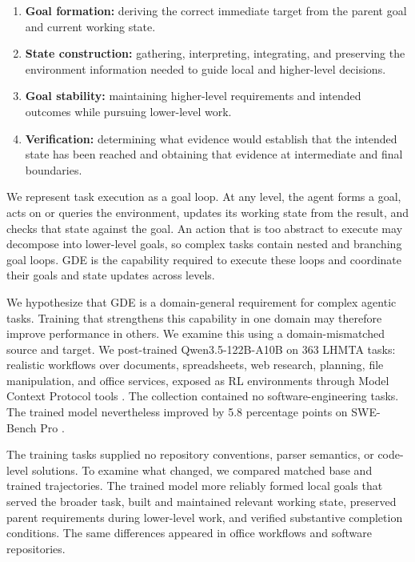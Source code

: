 \documentclass{article}
\begin{document}
\begin{enumerate}
  \item \textbf{Goal formation:} deriving the correct immediate target from the parent goal and current working state.
  \item \textbf{State construction:} gathering, interpreting, integrating, and preserving the environment information needed to guide local and higher-level decisions.
  \item \textbf{Goal stability:} maintaining higher-level requirements and intended outcomes while pursuing lower-level work.
  \item \textbf{Verification:} determining what evidence would establish that the intended state has been reached and obtaining that evidence at intermediate and final boundaries.
\end{enumerate}

We represent task execution as a goal loop. At any level, the agent forms a goal, acts on or queries the environment, updates its working state from the result, and checks that state against the goal. An action that is too abstract to execute may decompose into lower-level goals, so complex tasks contain nested and branching goal loops. GDE is the capability required to execute these loops and coordinate their goals and state updates across levels.

We hypothesize that GDE is a domain-general requirement for complex agentic tasks. Training that strengthens this capability in one domain may therefore improve performance in others. We examine this using a domain-mismatched source and target. We post-trained Qwen3.5-122B-A10B on 363 LHMTA tasks: realistic workflows over documents, spreadsheets, web research, planning, file manipulation, and office services, exposed as RL environments through Model Context Protocol tools \citep{anthropic2024mcp}. The collection contained no software-engineering tasks. The trained model nevertheless improved by 5.8 percentage points on SWE-Bench Pro \citep{deng2025swebenchpro}.

The training tasks supplied no repository conventions, parser semantics, or code-level solutions. To examine what changed, we compared matched base and trained trajectories. The trained model more reliably formed local goals that served the broader task, built and maintained relevant working state, preserved parent requirements during lower-level work, and verified substantive completion conditions. The same differences appeared in office workflows and software repositories.
\end{document}
